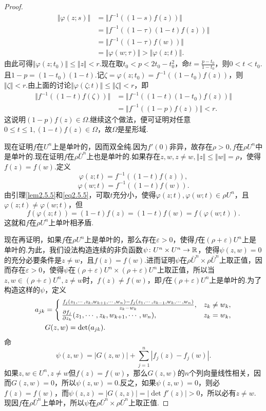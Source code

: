 \begin{proof}
\begin{align*}
	\Vert\varphi(z;s)\Vert
	&=\Vert f^{-1}((1-s)f(z))\Vert\\
	&=\Vert f^{-1}((1-\tau)(1-t)f(z))\Vert\\
	&=\Vert f^{-1}((1-\tau)f(w))\Vert\\
	&=\Vert\varphi(w;\tau)\Vert>\Vert\varphi(z;t)\Vert.
\end{align*}
由此可得$\Vert\varphi(z;t_0)\Vert\le\Vert z\Vert<r$.现在取$t_0<p<2t_0-t_0^2$，命$t=\frac{p-t_0}{1-t_0}$，则$0<t<t_0$.且$1-p=(1-t_0)(1-t)$.记$\zeta=\varphi(z;t_0)=f^{-1}((1-t_0)f(z))$，则$\Vert\zeta\Vert<r$.由上面的讨论$\Vert\varphi(\zeta;t)\Vert\le\Vert\zeta\Vert<r$，即
\begin{align*}
	\Vert f^{-1}((1-t)f(\zeta))\Vert
	&=\Vert f^{-1}((1-t)(1-t_0)f(z))\Vert\\
	&=\Vert f^{-1}((1-p)f(z))\Vert<r.
\end{align*}
这说明$(1-p)f(z)\in\Omega$.继续这个做法，便可证明对任意$0\le t\le1,(1-t)f(z)\in\Omega$，故$\Omega$是星形域.

现在证明$f$在$U^n$上是单叶的，因而双全纯.因为$f'(0)$非异，故存在$\rho>0,f$在$\rho U^n$中是单叶的.现在证明$f$在$\rho\bar{U}^n$上也是单叶的.如果存在$z,w,z\neq w,\Vert z\Vert\le\Vert w\Vert=\rho$，使得$f(z)=f(w)$.定义
\[\varphi(z;t)=f^{-1}((1-t)f(z)),\]
\[\varphi(w;t)=f^{-1}((1-t)f(w)).\]
由引理\ref{lem2.5.5}和\eqref{eq2.5.5}，可取$t$充分小，使得$\varphi(z;t),\varphi(w;t)\in\rho U^n$，且$\varphi(z;t)\neq\varphi(w;t)$，但
\[f(\varphi(z;t))=(1-t)f(z)=(1-t)f(w)=f(\varphi(w;t)).\]
这就和$f$在$\rho U^n$上单叶相矛盾.

现在再证明，如果$f$在$\rho U^n$上是单叶的，那么存在$\varepsilon>0$，使得$f$在$(\rho+\varepsilon)U^n$上是单叶的.为此，我们设法构造连续的非负函数$\psi\colon U^n\times U^n\to\mathbb R$，使得$\psi(z,w)=0$的充分必要条件是$z\neq w$，且$f(z)=f(w)$.进而证明$\psi$在$\rho \bar{U}^n\times\rho\bar{U}^n$上取正值，因而存在$\varepsilon>0$，使得$\psi$在$(\rho+\varepsilon)U^n\times(\rho+\varepsilon)U^n$上取正值，所以当$z,w\in(\rho+\varepsilon)U^n,z\neq w$时，$f(z)\neq f(w)$，即$f$在$(\rho+\varepsilon)U^n$上是单叶的.为了构造这样的$\psi$，定义
\begin{align*}
	a_{jk}
	&=\begin{cases}
		\frac{f_j(z_1,\cdots,z_k,w_{k+1},\cdots,w_n)-f_j(z_1,\cdots,z_{k-1},w_k,\cdots,w_n)}{z_k-w_k},&z_k\neq w_k,\\
		\frac{\partial f_j}{\partial z_k}(z_1,\cdots,z_k,w_{k+1},\cdots,w_n),&z_k=w_k,
	\end{cases}\\
&G(z,w)=\det(a_{jk}).
\end{align*}
命
\[\psi(z,w)=|G(z,w)|+\sum_{j=1}^{n}|f_j(z)-f_j(w)|.\]
如果$z,w\in U^n,z\neq w$但$f(z)=f(w)$，那么$G(z,w)$的$n$个列向量线性相关，因而$G(z,w)=0$，所以$\psi(z,w)=0$.反之，如果$\psi(z,w)=0$，则必$f(z)=f(w)$，而$\psi(z,z)=|G(z,z)|=|\det f'(z)|>0$，所以必有$z\neq w$.现因$f$在$\rho\bar{U}^n$上单叶，所以$\psi$在$\rho\bar{U}^n\times\rho\bar{U}^n$上取正值.
\end{proof}
